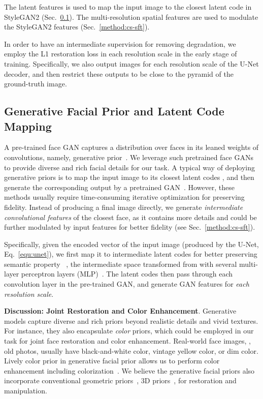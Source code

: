 \documentclass[final]{cvpr}
\begin{document}
The latent features  is used to map the input image to the closest latent code in StyleGAN2 (Sec.~\ref{method:latent_code_mapping}). The multi-resolution spatial features  are used to modulate the StyleGAN2 features (Sec.~\ref{method:cs-sft}). 

In order to have an intermediate supervision for removing degradation, we employ the L1 restoration loss in each resolution scale in the early stage of training. Specifically, we also output images for each resolution scale of the U-Net decoder, and then restrict these outputs to be close to the pyramid of the ground-truth image.






\subsection{Generative Facial Prior and Latent Code \\ Mapping}
\label{method:latent_code_mapping}
A pre-trained face GAN captures a distribution over faces in its leaned weights of convolutions, namely, generative prior~\cite{gu2020mGANprior,pan2020dgp}. 
We leverage such pretrained face GANs to provide diverse and rich facial details for our task.
A typical way of deploying generative priors is to map the input image to its closest latent codes , and then generate  the corresponding output by a pretrained GAN~\cite{abdal2019image2stylegan,zhu2020domain,pan2020dgp,gu2020mGANprior}.
However, these methods usually require time-consuming iterative optimization for preserving fidelity.
Instead of producing a final image directly, we generate \textit{intermediate convolutional features}  of the closest face, as it contains more details and could be further modulated by input features for better fidelity (see Sec.~\ref{method:cs-sft}).

Specifically, given the encoded vector  of the input image (produced by the U-Net, Eq.~\ref{equ:unet}), we first map it to intermediate latent codes   for better preserving semantic property~ \ie, the intermediate space transformed from  with several multi-layer perceptron layers (MLP)~\cite{zhu2020domain}.
The latent codes  then pass through each convolution layer in the pre-trained GAN, and generate GAN features for \textit{each resolution scale}. 






\noindent\textbf{Discussion: Joint Restoration and Color Enhancement}.
Generative models capture diverse and rich priors beyond realistic details and vivid textures. 
For instance, they also encapsulate \textit{color} priors, which could be employed in our task for joint face restoration and color enhancement.
Real-world face images, \eg, old photos, usually have black-and-white color, vintage yellow color, or dim color. Lively color prior in generative facial prior allows us to perform color enhancement including colorization~\cite{zhang2016colorful}.
We believe the generative facial priors also incorporate conventional geometric priors~\cite{chen2018fsrnet,yu2018face}, 3D priors~\cite{gecer2019ganfit}, \etc for restoration and manipulation.
\end{document}
